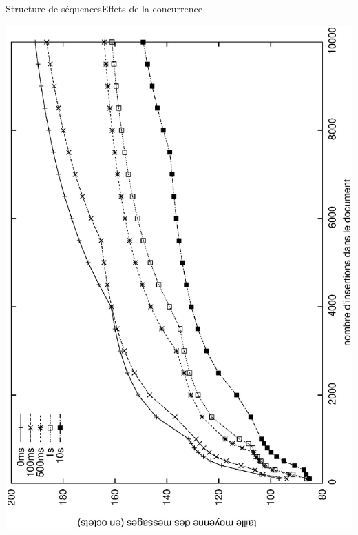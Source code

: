 \begin{frame}{Structure de séquences}{Effets de la concurrence}
  \vspace{-0.5cm}
  \begin{center}
    \includegraphics[angle=-90, width=\textwidth]{img/replication/latency.eps}
  \end{center}
\end{frame}

